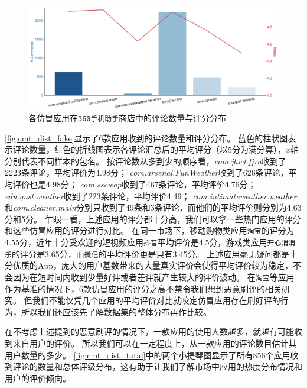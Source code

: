 \begin{figure}[htbp]
	\centering
	\includegraphics[width=\textwidth]{./Figures/edwin-cmt-ratings-dist-3.png}
    \caption{各仿冒应用在\texttt{360手机助手}商店中的评论数量与评分分布}
    \label{fig:cmt_dist_fake}
\end{figure}

\autoref{fig:cmt_dist_fake}显示了6款应用收到的评论数量和评分分布。
蓝色的柱状图表示评论数量，红色的折线图表示各评论汇总后的平均评分（以5分为满分算），$x$轴分别代表不同样本的包名。
按评论数从多到少的顺序看，\emph{com.jhwl.fjxa}收到了2223条评论，平均评价为4.98分；
\emph{com.arsenal.FunWeather}收到了626条评论，平均评价也是4.98分；
\emph{com.sscwap}收到了467条评论，平均评价4.76分；
\emph{edu.qust.weather}收到了223条评论，平均评价4.49；
\emph{com.intimateweather.weather}和\emph{com.cleaner.main}分别只收到了49条和3条评论，而他们的平均评价则分别为4.63分和5分。
乍眼一看，上述应用的评分都十分高，我们可以拿一些热门应用的评分和这些仿冒应用的评分进行对比。
在同一市场下，移动购物类应用\texttt{淘宝}的评分为4.55分，近年十分受欢迎的短视频应用\texttt{抖音}平均评价是4.5分，游戏类应用\texttt{开心消消乐}的评分是3.65分，而\texttt{微信}的平均评价更是只有3.45分。
上述应用毫无疑问都是十分优质的App，庞大的用户基数带来的大量真实评价会使得平均评价较为稳定，不会因为在短时间内收到少量好评或者差评就产生较大的评价波动。
在\texttt{淘宝}等应用作为基准的情况下，6款仿冒应用的评分之高不禁令我们想到恶意刷评的相关研究。
但我们不能仅凭几个应用的平均评价对比就咬定仿冒应用存在刷好评的行为，所以我们还应该先了解数据集的整体分布再作比较。

在不考虑上述提到的恶意刷评的情况下，一款应用的使用人数越多，就越有可能收到来自用户的评价。
所以我们可以在一定程度上，从一款应用的评论数目估计其用户数量的多少。
\autoref{fig:cmt_dist_total}中的两个小提琴图显示了所有856个应用收到评论的数量和总体评级分布，这有助于让我们了解市场中应用的热度分布情况和用户的评价倾向。

%
%
%

